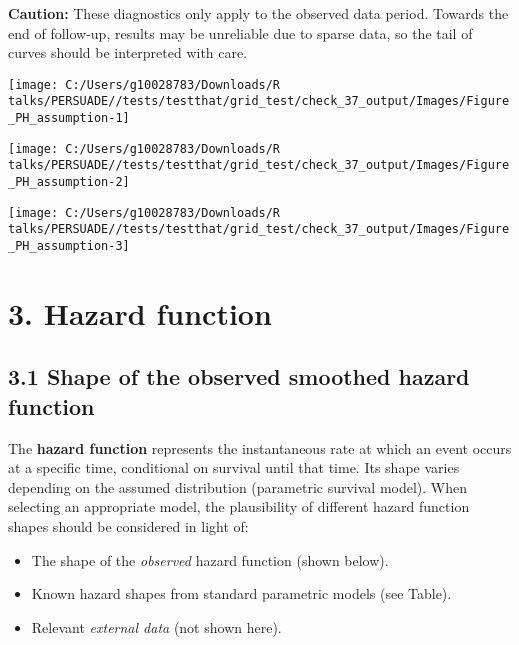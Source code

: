 \documentclass[
]{article}
\providecommand{\tightlist}{%
  \setlength{\itemsep}{0pt}\setlength{\parskip}{0pt}}
\begin{document}
\textbf{Caution:} These diagnostics only apply to the observed data
period. Towards the end of follow-up, results may be unreliable due to
sparse data, so the tail of curves should be interpreted with care.

\clearpage

\begin{flushleft}\texttt{[image: C:/Users/g10028783/Downloads/R talks/PERSUADE//tests/testthat/grid\_test/check\_37\_output/Images/Figure\_PH\_assumption-1]} \end{flushleft}

\begin{flushleft}\texttt{[image: C:/Users/g10028783/Downloads/R talks/PERSUADE//tests/testthat/grid\_test/check\_37\_output/Images/Figure\_PH\_assumption-2]} \end{flushleft}

\begin{flushleft}\texttt{[image: C:/Users/g10028783/Downloads/R talks/PERSUADE//tests/testthat/grid\_test/check\_37\_output/Images/Figure\_PH\_assumption-3]} \end{flushleft}

\clearpage

\section{3. Hazard function}\label{hazard-function}

\subsection{3.1 Shape of the observed smoothed hazard
function}\label{shape-of-the-observed-smoothed-hazard-function}

The \textbf{hazard function} represents the instantaneous rate at which
an event occurs at a specific time, conditional on survival until that
time. Its shape varies depending on the assumed distribution (parametric
survival model). When selecting an appropriate model, the plausibility
of different hazard function shapes should be considered in light of:

\begin{itemize}
\tightlist
\item
  The shape of the \emph{observed} hazard function (shown below).
\item
  Known hazard shapes from standard parametric models (see Table).
\item
  Relevant \emph{external data} (not shown here).
\end{itemize}
\end{document}
